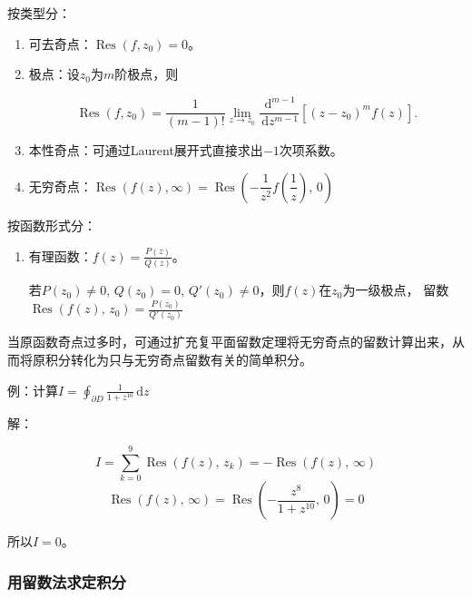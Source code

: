 \documentclass[UTF8,fontset=fandol,zihao=5]{ctexart}
\newcommand{\dd}{\,\mathrm{d}}
\newcommand{\Res}{\operatorname{Res}}
\begin{document}
\begin{methodbox}[【技巧】计算留数]
  按类型分：
  
  \begin{enumerate}
    \item 可去奇点：$\Res(f,z_0)=0$。
    
    \item 极点：设$z_0$为$m$阶极点，则
    
    \[
      \Res(f,z_0)=\frac{1}{(m-1)!}\lim_{z\to z_0}\frac{\dd^{m-1}}{\dd z^{m-1}}\left[(z-z_0)^mf(z)\right].
    \]
    
    \item 本性奇点：可通过Laurent展开式直接求出$-1$次项系数。
    
    \item 无穷奇点：$\Res (f(z),\infty)=\Res\left(-\dfrac{1}{z^2}f\left(\dfrac{1}{z}\right),\,0\right)$
  \end{enumerate}

  按函数形式分：
  \begin{enumerate}
    \item 有理函数：$\displaystyle f(z)=\frac{P(z)}{Q(z)}$。
    
    若$P(z_0)\ne0,\,Q(z_0)=0,\,Q'(z_0)\ne0$，则$f(z)$在$z_0$为一级极点，
    留数$\displaystyle\Res(f(z),\,z_0)=\frac{P(z_0)}{Q'(z_0)}$

  \end{enumerate}

\end{methodbox}

\begin{methodbox}[【技巧】用扩充复平面留数定理计算多奇点定积分]
  当原函数奇点过多时，可通过扩充复平面留数定理将无穷奇点的留数计算出来，从而将原积分转化为只与无穷奇点留数有关的简单积分。

  例：计算$\displaystyle I=\oint_{\partial D}\frac{1}{1+z^{10}}\dd z$

  解：
  
  \[
  I=\sum_{k=0}^{9}\Res(f(z),\,z_k)=-\Res(f(z),\,\infty)
  \]
  \[
  \Res(f(z),\,\infty)=\Res\left(-\dfrac{z^8}{1+z^{10}},\,0\right)=0
  \]

  所以$I=0$。
\end{methodbox}

\subsubsection{用留数法求定积分}
\end{document}
